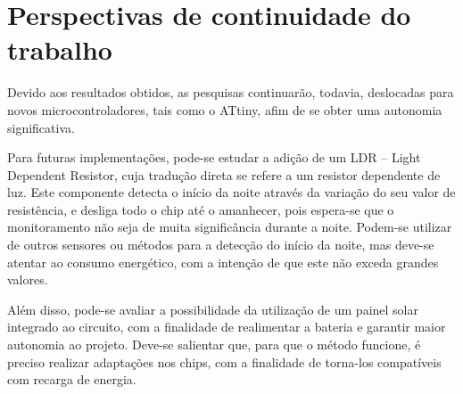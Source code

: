 \newpage
\section{Perspectivas de continuidade do trabalho}
\label{sc:continuidade_}

{
Devido aos resultados obtidos, as pesquisas continuarão, todavia, deslocadas para novos microcontroladores, tais como o ATtiny, afim de se obter uma autonomia significativa.
}

{
Para futuras implementações, pode-se estudar a adição de um LDR – Light Dependent Resistor, cuja tradução direta se refere a um resistor dependente de luz. Este componente detecta o início da noite através da variação do seu valor de resistência, e desliga todo o chip até o amanhecer, pois espera-se que o monitoramento não seja de muita significância durante a noite. Podem-se utilizar de outros sensores ou métodos para a detecção do início da noite, mas deve-se atentar ao consumo energético, com a intenção de que este não exceda grandes valores.
}

{
Além disso, pode-se avaliar a possibilidade da utilização de um painel solar integrado ao circuito, com a finalidade de realimentar a bateria e garantir maior autonomia ao projeto. Deve-se salientar que, para que o método funcione, é preciso realizar adaptações nos chips, com a finalidade de torna-los compatíveis com recarga de energia.
}
